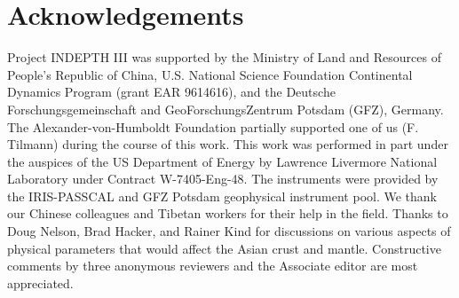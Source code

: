 \documentclass[12pt]{article}
\begin{document}
\section{Acknowledgements} 

Project INDEPTH III was supported by the Ministry of Land and Resources of People's Republic of China, U.S. 
National Science Foundation Continental Dynamics Program (grant EAR 9614616), and the Deutsche 
Forschungsgemeinschaft and GeoForschungsZentrum Potsdam (GFZ), Germany.  The Alexander-von-Humboldt 
Foundation partially supported one of us (F. Tilmann) during the course of this work.  This work was 
performed in part under the auspices of the US Department of Energy by Lawrence Livermore National 
Laboratory under Contract W-7405-Eng-48.  The instruments were provided by the IRIS-PASSCAL and GFZ Potsdam 
geophysical instrument pool.  We thank our Chinese colleagues and Tibetan workers for their help in the 
field.  Thanks to Doug Nelson, Brad Hacker, and Rainer Kind for discussions on various aspects of physical 
parameters that would affect the Asian crust and mantle.  Constructive comments by three anonymous reviewers and the 
Associate editor are most appreciated. 
\end{document}
